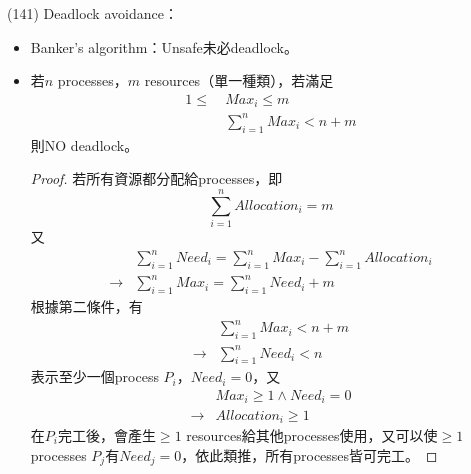 \begin{theorem}{(141)} Deadlock avoidance：\begin{itemize}
        \item Banker's algorithm：Unsafe未必deadlock。
        \item 若$n$ processes，$m$ resources（單一種類），若滿足\begin{equation} \label{eq:deadlock}
            \begin{aligned}
                1 \le \ & Max_i \le m \\
                & \sum_{i = 1}^{n} Max_i < n + m
            \end{aligned}
        \end{equation} 則NO deadlock。\\ \begin{proof}
            若所有資源都分配給processes，即\begin{equation}
                \sum_{i = 1}^{n} Allocation_i = m
            \end{equation} 又\begin{equation}
                \begin{aligned}
                    & \sum_{i = 1}^{n} Need_i = \sum_{i = 1}^{n} Max_i - \sum_{i = 1}^{n} Allocation_i \\
                    \rightarrow & \sum_{i = 1}^{n} Max_i = \sum_{i = 1}^{n} Need_i + m
                \end{aligned}
            \end{equation}
            根據第二條件，有\begin{equation}
                \begin{aligned}
                    & \sum_{i = 1}^{n} Max_i < n + m \\
                    \rightarrow & \sum_{i = 1}^{n} Need_i < n
                \end{aligned}
            \end{equation}表示至少一個process $P_i$，$Need_i = 0$，又\begin{equation}
                \begin{aligned}
                    & Max_i \ge 1 \land Need_i = 0 \\
                    \rightarrow & Allocation_i \ge 1
                \end{aligned}
            \end{equation}在$P_i$完工後，會產生$\ge 1$ resources給其他processes使用，又可以使$\ge 1$ processes $P_j$有$Need_j = 0$，依此類推，所有processes皆可完工。

\end{proof}
\end{itemize}
\end{theorem}
